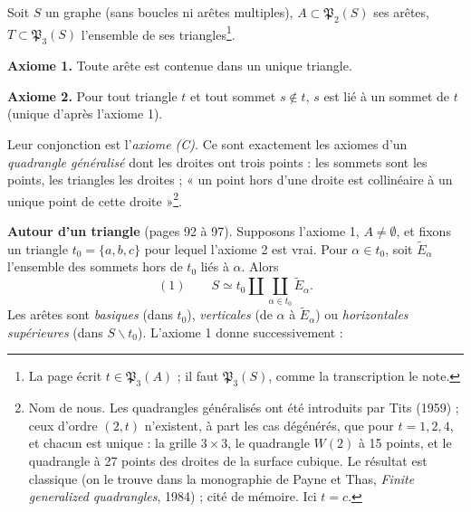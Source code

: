 \documentclass[11pt,a4paper]{article}
\begin{document}
Soit $S$ un graphe (sans boucles ni arêtes multiples), $A \subset
\mathfrak{P}_2(S)$ ses arêtes, $T \subset \mathfrak{P}_3(S)$ l'ensemble de ses
triangles\footnote{La page écrit $t \in \mathfrak{P}_3(A)$ ; il faut
$\mathfrak{P}_3(S)$, comme la transcription le note.}.

\textbf{Axiome 1.} Toute arête est contenue dans un unique triangle.

\textbf{Axiome 2.} Pour tout triangle $t$ et tout sommet $s \notin t$, $s$ est lié à
un sommet de $t$ (unique d'après l'axiome 1).

Leur conjonction est l'\emph{axiome (C)}. Ce sont exactement les axiomes d'un
\emph{quadrangle généralisé} dont les droites ont trois points : les sommets
sont les points, les triangles les droites ; « un point hors d'une droite est
collinéaire à un unique point de cette droite »\footnote{Nom de nous. Les
quadrangles généralisés ont été introduits par Tits (1959) ; ceux d'ordre $(2,
t)$ n'existent, à part les cas dégénérés, que pour $t = 1, 2, 4$, et chacun est
unique : la grille $3 \times 3$, le quadrangle $W(2)$ à 15 points, et le
quadrangle à 27 points des droites de la surface cubique. Le résultat est
classique (on le trouve dans la monographie de Payne et Thas, \emph{Finite
generalized quadrangles}, 1984) ; cité de mémoire. Ici $t = c$.}.

\textbf{Autour d'un triangle} (pages 92 à 97). Supposons l'axiome 1, $A \neq
\emptyset$, et fixons un triangle $t_0 = \lbrace a, b, c\rbrace$ pour lequel
l'axiome 2 est vrai. Pour $\alpha \in t_0$, soit $\widetilde E_\alpha$
l'ensemble des sommets hors de $t_0$ liés à $\alpha$. Alors
\[
(1) \qquad S \simeq t_0 \amalg \coprod_{\alpha \in t_0} \widetilde E_\alpha .
\]
Les arêtes sont \emph{basiques} (dans $t_0$), \emph{verticales} (de $\alpha$ à
$\widetilde E_\alpha$) ou \emph{horizontales supérieures} (dans $S \smallsetminus
t_0$). L'axiome 1 donne successivement :
\end{document}
